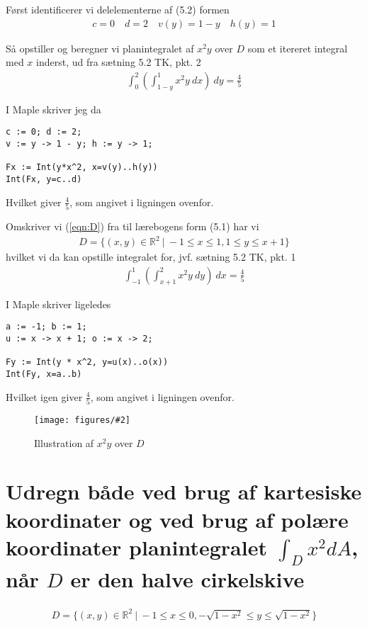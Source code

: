 \documentclass[11pt,a4paper]{article}
\newcommand{\with}[1]{{\ }d#1}
\newcommand{\Int}[4]{\int_{#1}^{#2}#3\with{#4}}
\newcommand{\fig}[4]
{
    \begin{figure}[H]
        \centering
        \texttt{[image: figures/\#2]}
        \caption{#4}
        \label{fig:#1}
    \end{figure}
}
\begin{document}
\begin{multicols}{2}
Først identificerer vi delelementerne af (5.2) formen
\begin{align}
    c = 0 \quad
    d = 2 \quad
    v(y) = 1 - y \quad
    h(y) = 1
\end{align}

Så opstiller og beregner vi planintegralet af $x^2 y$ over $D$ som et
itereret integral med $x$ inderst, ud fra sætning 5.2 TK, pkt. 2
\begin{align}
    \Int{0}{2}{ \left( \Int{1-y}{1}{x^2 y}{x} \right) }{y}
    =
    \frac{4}{5}
\end{align}

I Maple skriver jeg da
\begin{lstlisting}
c := 0; d := 2;
v := y -> 1 - y; h := y -> 1;

Fx := Int(y*x^2, x=v(y)..h(y))
Int(Fx, y=c..d)
\end{lstlisting}
Hvilket giver $\frac{4}{5}$, som angivet i ligningen ovenfor.

Omskriver vi (\ref{eqn:D}) fra til lærebogens form (5.1) har vi
\begin{align}
    D = \{ (x,y) \in \mathbb{R}^2{\ }|{\ }-1 \leq x \leq 1, 1 \leq y \leq x + 1 \}
\end{align}
hvilket vi da kan opstille integralet for, jvf. sætning 5.2 TK, pkt. 1
\begin{align}
    \Int{-1}{1}{ \left( \Int{x+1}{2}{x^2 y}{y} \right) }{x}
    = \frac{4}{5}
\end{align}

I Maple skriver ligeledes
\begin{lstlisting}
a := -1; b := 1;
u := x -> x + 1; o := x -> 2;

Fy := Int(y * x^2, y=u(x)..o(x))
Int(Fy, x=a..b)
\end{lstlisting}
Hvilket igen giver $\frac{4}{5}$, som angivet i ligningen ovenfor.

\fig{9-1-f}{9-1-f.png}{0.5}{Illustration af $x^2 y$ over $D$}

\end{multicols}

\newpage
\section
{
    \mdseries
    Udregn både ved brug af kartesiske koordinater og ved brug af polære
    koordinater planintegralet $\int_D x^2 d A$, når $D$ er den halve
    cirkelskive
}
\begin{align}
    D = \{ (x,y) \in \mathbb{R}^2{\ }|{\ }
        -1 \leq x \leq 0,
    -\sqrt{1 - x^2} \leq y \leq \sqrt{1 - x^2} \}
\end{align}
\end{document}
